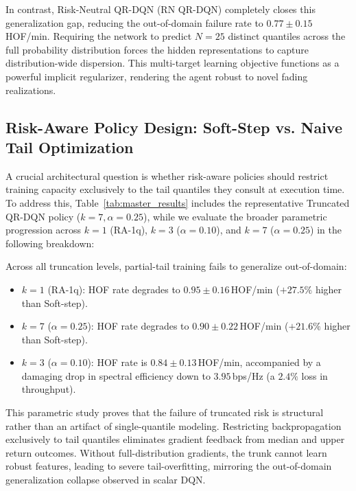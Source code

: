 \documentclass{ieeetmlcn}
\begin{document}
In contrast, Risk-Neutral QR-DQN (RN QR-DQN) completely closes this generalization gap, reducing the out-of-domain failure rate to $0.77 \pm 0.15$\,HOF/min. Requiring the network to predict $N=25$ distinct quantiles across the full probability distribution forces the hidden representations to capture distribution-wide dispersion. This multi-target learning objective functions as a powerful implicit regularizer, rendering the agent robust to novel fading realizations.

\subsection{Risk-Aware Policy Design: Soft-Step vs. Naive Tail Optimization}
\label{sec:results-risk}
A crucial architectural question is whether risk-aware policies should restrict training capacity exclusively to the tail quantiles they consult at execution time. To address this, Table~\ref{tab:master_results} includes the representative Truncated QR-DQN policy ($k=7, \alpha=0.25$), while we evaluate the broader parametric progression across $k=1$ (RA-1q), $k=3$ ($\alpha=0.10$), and $k=7$ ($\alpha=0.25$) in the following breakdown:

Across all truncation levels, partial-tail training fails to generalize out-of-domain:
\begin{itemize}\setlength\itemsep{0.5pt}\setlength\parskip{0pt}
    \item $k=1$ (RA-1q): HOF rate degrades to $0.95 \pm 0.16$\,HOF/min ($+27.5\%$ higher than Soft-step).
    \item $k=7$ ($\alpha=0.25$): HOF rate degrades to $0.90 \pm 0.22$\,HOF/min ($+21.6\%$ higher than Soft-step).
    \item $k=3$ ($\alpha=0.10$): HOF rate is $0.84 \pm 0.13$\,HOF/min, accompanied by a damaging drop in spectral efficiency down to $3.95$\,bps/Hz (a $2.4\%$ loss in throughput).
\end{itemize}
This parametric study proves that the failure of truncated risk is structural rather than an artifact of single-quantile modeling. Restricting backpropagation exclusively to tail quantiles eliminates gradient feedback from median and upper return outcomes. Without full-distribution gradients, the trunk cannot learn robust features, leading to severe tail-overfitting, mirroring the out-of-domain generalization collapse observed in scalar DQN.
\end{document}

